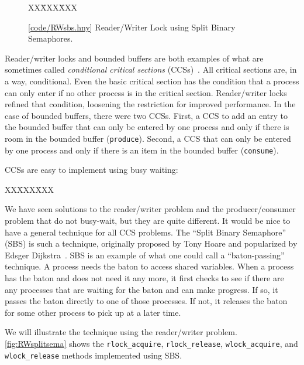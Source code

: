 \documentclass{report}
\newcommand{\harmonysource}[1]{
\begin{tabbing}
XX\=XXX\=XXX\kill
    
\end{tabbing}
}
\newcommand{\harmonylink}[1]{%
[\href{https://www.cs.cornell.edu/home/rvr/harmony/#1}{\underline{#1}}]%
}
\newenvironment{code}{
\tcolorbox
}{
\endtcolorbox
}
\begin{document}
\begin{figure}
\begin{code}
\harmonysource{RWsbs}
\end{code}
\caption{\harmonylink{code/RWsbs.hny} Reader/Writer Lock using Split Binary Semaphores.}
\label{fig:RWsplitsema}
\end{figure}

%

Reader/writer locks and bounded buffers are both examples of what are
sometimes called \emph{conditional critical sections}
%
(CCSs)~\cite{Hoare73}.
All critical sections are, in a way, conditional.  Even the basic critical section
has the condition that a process can only enter if no other process
is in the critical section.  Reader/writer locks refined that condition, loosening
the restriction for improved performance.
In the case of bounded buffers, there were two CCSs.  First, a CCS
to add an entry to the bounded buffer that can only be entered by one
process and only if there is room in the bounded buffer (\texttt{produce}).
Second, a CCS that can only be entered by one process and
only if there is an item in the bounded buffer (\texttt{consume}).

CCSs are easy to implement using busy waiting:
\begin{code}
\harmonysource{busywait}
\end{code}

We have seen solutions to the reader/writer problem and the producer/consumer
problem that do not busy-wait, but they are quite different.  It would be nice
to have a general technique for all CCS problems.
The ``Split Binary Semaphore'' (SBS) is such a technique, originally proposed by
Tony Hoare and popularized by Edsger Dijkstra~\cite{EWD703}.
SBS is an example of what one could call a ``baton-passing'' technique.
A process needs the baton to access shared variables.
When a process has the baton and does not need it any more,
it first checks to see if there are any processes that are waiting for the
baton and can make progress.
If so, it passes the baton directly to one of those processes.
If not, it releases the baton for some other process to pick up at a
later time.

We will illustrate the technique using the reader/writer problem.
\autoref{fig:RWsplitsema} shows the
\texttt{rlock\_acquire}, \texttt{rlock\_release},
\texttt{wlock\_acquire}, and \texttt{wlock\_release} methods implemented using
SBS.
\end{document}
